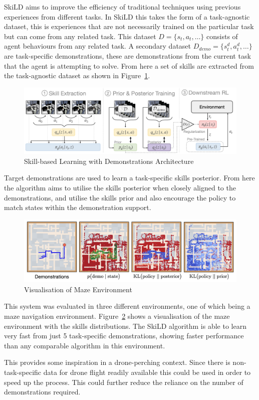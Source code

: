 SkiLD aims to improve the efficiency of traditional techniques using previous experiences from different tasks.
In SkiLD this takes the form of a task-agnostic dataset, this is experiences that are not necessarily trained on the particular task but can come from any related task.
This dataset $D = \{s_t, a_t, \dots\}$ consists of agent behaviours from any related task.
A secondary dataset $D_{demo} = \{s_{t}^{d}, a_{t}^{d}, \dots\}$ are task-specific demonstrations, these are demonstrations from the current task that the agent is attempting to solve.
From here a set of skills are extracted from the task-agnostic dataset as shown in Figure~\ref{fig:fyp15-skild}.

\begin{figure}[htbp]
  \centering
  \includegraphics[width=\textwidth]{background/fyp15-skild-architecture.png}
  \caption{Skill-based Learning with Demonstrations Architecture}
\label{fig:fyp15-skild}
\end{figure}

Target demonstrations are used to learn a task-specific skills posterior.
From here the algorithm aims to utilise the skills posterior when closely aligned to the demonstrations, and utilise the skills prior and also encourage the policy to match states within the demonstration support.

\begin{figure}[htbp]
  \centering
  \includegraphics[width=\textwidth]{background/fyp15-maze-diagram.png}
  \caption{Visualisation of Maze Environment}
\label{fig:fyp15-maze}
\end{figure}

This system was evaluated in three different environments, one of which being a maze navigation environment.
Figure~\ref{fig:fyp15-maze} shows a visualisation of the maze environment with the skills distributions.
The SkiLD algorithm is able to learn very fast from just 5 task-specific demonstrations, showing faster performance than any comparable algorithm in this environment.

This provides some inspiration in a drone-perching context.
Since there is non-task-specific data for drone flight readily available this could be used in order to speed up the process.
This could further reduce the reliance on the number of demonstrations required.